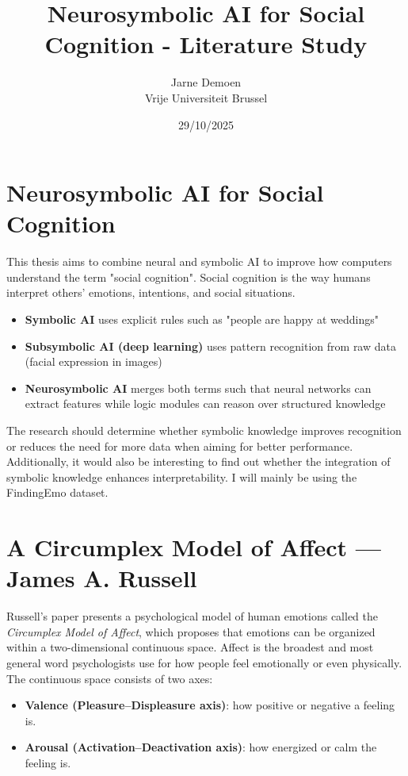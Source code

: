 \documentclass[12pt]{article}
\title{Neurosymbolic AI for Social Cognition - Literature Study}
\author{Jarne Demoen\\
Vrije Universiteit Brussel}
\date{29/10/2025}
\begin{document}
\maketitle
\section{Neurosymbolic AI for Social Cognition}
This thesis aims to combine neural and symbolic AI to improve how computers understand the term "social cognition". Social cognition is the way humans interpret others' emotions, intentions, and social situations.

\begin{itemize}
	\item{\textbf{Symbolic AI} uses explicit rules such as "people are happy at weddings"}
	\item{\textbf{Subsymbolic AI (deep learning)} uses pattern recognition from raw data (facial expression in images)}
	\item{\textbf{Neurosymbolic AI} merges both terms such that neural networks can extract features while logic modules can reason over structured knowledge}
\end{itemize}

The research should determine whether symbolic knowledge improves recognition or reduces the need for more data when aiming for better performance. Additionally, it would also be interesting to find out whether the integration of symbolic knowledge enhances interpretability. I will mainly be using the FindingEmo dataset.

\section{A Circumplex Model of Affect --- James A. Russell}

Russell’s paper presents a psychological model of human emotions called the \textit{Circumplex Model of Affect}, which proposes that emotions can be organized within a two-dimensional continuous space. Affect is the broadest and most general word psychologists use for how people feel emotionally or even physically. The continuous space consists of two axes:

\begin{itemize}
    \item \textbf{Valence (Pleasure–Displeasure axis)}: how positive or negative a feeling is.
    \item \textbf{Arousal (Activation–Deactivation axis)}: how energized or calm the feeling is.
\end{itemize}
\end{document}
